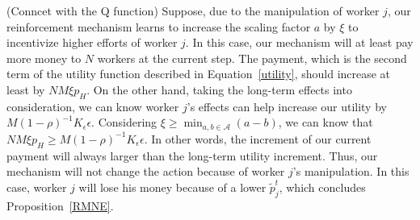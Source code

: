 \documentclass{article}
\begin{document}

{\color{red} (Conncet with the Q function) Suppose, due to the manipulation of worker $j$, our reinforcement mechanism learns to increase the scaling factor $a$ by $\xi$ to incentivize higher efforts of worker $j$. In this case, our mechanism will at least pay more money to $N$ workers at the current step. The payment, which is the second term of the utility function described in Equation~\ref{utility}, should increase at least by $NM \xi p_H$. On the other hand, taking the long-term effects into consideration, we can know worker $j$'s effects can help increase our utility by $M(1-\rho)^{-1}K_{\epsilon} \epsilon$. Considering $\xi\geq \min_{a,b\in \mathcal{A}}(a-b)$, we can know that $NM \xi p_H\geq M(1-\rho)^{-1}K_{\epsilon} \epsilon$. In other words, the increment of our current payment will always larger than the long-term utility increment. Thus, our mechanism will not change the action because of worker $j$'s manipulation. In this case, worker $j$ will lose his money because of a lower $\tilde{p}^t_j$, which concludes Proposition~\ref{RMNE}.}
\end{document}
